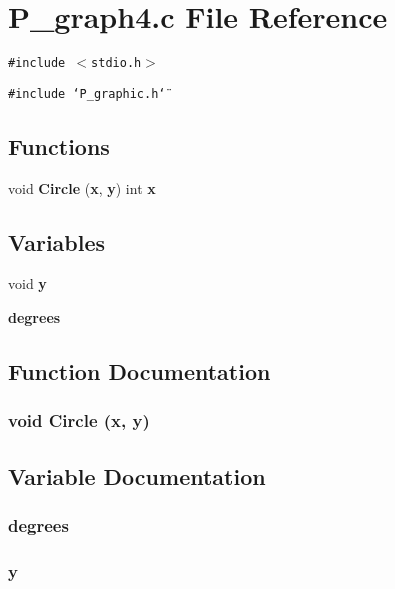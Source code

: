 \section{P\_\-graph4.c File Reference}
\label{P__graph4_8c}
{\tt \#include $<$stdio.h$>$}\par
{\tt \#include \char`\"{}P\_\-graphic.h\char`\"{}}\par
\subsection*{Functions}
\begin{CompactItemize}
\item 
void {\bf Circle} ({\bf x}, {\bf y}) int {\bf x}
\end{CompactItemize}
\subsection*{Variables}
\begin{CompactItemize}
\item 
void {\bf y}
\item 
{\bf degrees}
\end{CompactItemize}


\subsection{Function Documentation}
\subsubsection{\setlength{\rightskip}{0pt plus 5cm}void Circle ({\bf x}, {\bf y})}\label{P__graph4_8c_a2}




\subsection{Variable Documentation}
\subsubsection{\setlength{\rightskip}{0pt plus 5cm}degrees}\label{P__graph4_8c_a1}


\subsubsection{\setlength{\rightskip}{0pt plus 5cm}y}\label{P__graph4_8c_a0}


